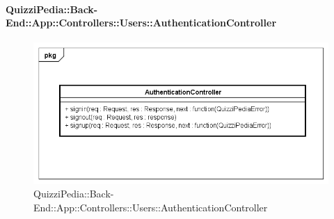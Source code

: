 \paragraph{QuizziPedia::Back-End::App::Controllers::Users::AuthenticationController}
\label{QuizziPedia::Back-End::App::Controllers::Users::AuthenticationController}
\begin{figure}[ht]
	\centering
	\includegraphics[scale=0.45]{UML/Classi/Back-End/QuizziPedia_Back-End_App_Controllers_Users_AuthenticationController.png}
	\caption{QuizziPedia::Back-End::App::Controllers::Users::AuthenticationController}
\end{figure}
\FloatBarrier
